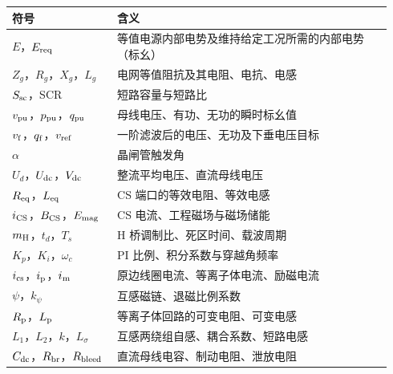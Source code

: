 
\begin{nomenclature}
\small\renewcommand{\arraystretch}{1.12}
\begin{longtable}{P{0.26\linewidth}P{0.68\linewidth}}
\toprule
{} 符号 & 含义 \\
\midrule\addlinespace[2pt]
\endhead
\bottomrule
\endfoot
$E$，$E_{\mathrm{req}}$ & 等值电源内部电势及维持给定工况所需的内部电势（标幺） \\
$Z_g$，$R_g$，$X_g$，$L_g$ & 电网等值阻抗及其电阻、电抗、电感 \\
$S_{\mathrm{sc}}$，SCR & 短路容量与短路比 \\
$v_{\mathrm{pu}}$，$p_{\mathrm{pu}}$，$q_{\mathrm{pu}}$ & 母线电压、有功、无功的瞬时标幺值 \\
$v_{\mathrm{f}}$，$q_{\mathrm{f}}$，$v_{\mathrm{ref}}$ & 一阶滤波后的电压、无功及下垂电压目标 \\
$\alpha$ & 晶闸管触发角 \\
$U_d$，$U_{\mathrm{dc}}$，$V_{\mathrm{dc}}$ & 整流平均电压、直流母线电压 \\
$R_{\mathrm{eq}}$，$L_{\mathrm{eq}}$ & CS 端口的等效电阻、等效电感 \\
$i_{\mathrm{CS}}$，$B_{\mathrm{CS}}$，$E_{\mathrm{mag}}$ & CS 电流、工程磁场与磁场储能 \\
$m_{\mathrm{H}}$，$t_d$，$T_s$ & H 桥调制比、死区时间、载波周期 \\
$K_p$，$K_i$，$\omega_c$ & PI 比例、积分系数与穿越角频率 \\
$i_{\mathrm{cs}}$，$i_{\mathrm{p}}$，$i_{\mathrm{m}}$ & 原边线圈电流、等离子体电流、励磁电流 \\
$\psi$，$k_\psi$ & 互感磁链、退磁比例系数 \\
$R_{\mathrm{p}}$，$L_{\mathrm{p}}$ & 等离子体回路的可变电阻、可变电感 \\
$L_1$，$L_2$，$k$，$L_\sigma$ & 互感两绕组自感、耦合系数、短路电感 \\
$C_{\mathrm{dc}}$，$R_{\mathrm{br}}$，$R_{\mathrm{bleed}}$ & 直流母线电容、制动电阻、泄放电阻 \\
\end{longtable}
\end{nomenclature}

